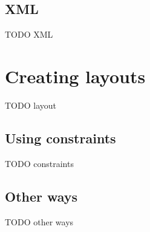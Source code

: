    \subsection{\mxp XML}

    TODO XML

  \section{Creating layouts}

   TODO layout

   \subsection{Using constraints}

    TODO constraints

   \subsection{Other ways}

    TODO other ways

